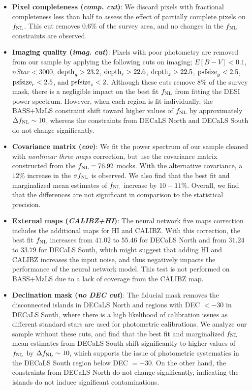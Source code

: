 \begin{itemize}[itemindent=*]
\item \textbf{Pixel completeness (\textit{comp. cut})}: We discard pixels with fractional completeness less than half to assess the effect of partially complete pixels on $f_{\rm NL}$. This cut removes $0.6\%$ of the survey area, and no changes in the $f_{\rm NL}$ constraints are observed.

\item \textbf{Imaging quality (\textit{imag. cut})}: Pixels with poor photometry are removed from our sample by applying the following cuts on imaging; $E[B-V]<0.1$, $nStar < 3000$, ${\rm depth}_{g} > 23.2$, ${\rm depth}_{r} > 22.6$, ${\rm depth}_{z} > 22.5$, ${\rm psfsize}_{g}<2.5$, ${\rm psfsize}_{r}<2.5$, and ${\rm psfsize}_{z}<2$. Although these cuts remove $8\%$ of the survey mask, there is a negligible impact on the best fit $f_{\rm NL}$ from fitting the DESI power spectrum. However, when each region is fit individually, the BASS+MzLS constraint shift toward higher values of $f_{\rm NL}$ by approximately $\Delta f_{\rm NL} \sim 10$, whereas the constraints from DECaLS North and DECaLS South do not change significantly. 

\item \textbf{Covariance matrix (\textit{cov})}: We fit the power spectrum of our sample cleaned with \textit{nonlinear three maps} correction, but use the covariance matrix constructed from the $f_{\rm NL}=76.92$ mocks. With the alternative covariance, a $12\%$ increase in the $\sigma f_{\rm NL}$ is observed. We also find that the best fit and marginalized mean estimates of $f_{\rm NL}$ increase by $10-11\%$. Overall, we find that the differences are not significant in comparison to the statistical precision.

\item \textbf{External maps (\textit{CALIBZ+HI})}: The neural network five maps correction includes the additional maps for HI and CALIBZ. With this correction, the best fit $f_{\rm NL}$ increases from $41.02$ to $55.46$ for DECaLS North and from $31.24$ to $33.79$ for DECaLS South, which might suggest that adding HI and CALIBZ increases the input noise, and thus negatively impacts the performance of the neural network model. This test is not performed on BASS+MzLS due to a lack of coverage from the CALIBZ map. 

\item \textbf{Declination mask (\textit{no DEC cut})}: The fiducial mask removes the disconnected islands in DECaLS North and regions with DEC $<-30$ in DECaLS South, where there is a high likelihood of calibration issues as different standard stars are used for photometric calibrations. We analyze our sample without these cuts, and find that the best fit and marginalized $f_{\rm NL}$ mean estimates from DECaLS South shift significantly to higher values of $f_{\rm NL}$ by $\Delta f_{\rm NL} \sim 10$, which supports the issue of photometric systematics in the DECaLS South region below DEC $=-30$. On the other hand, the constraints from DECaLS North do not change significantly, indicating the islands do not induce significant contaminations. 


\end{itemize}
